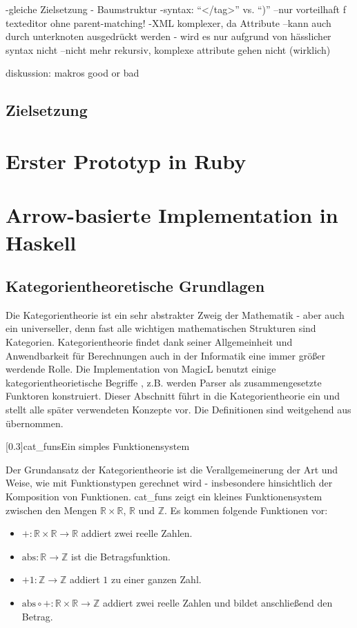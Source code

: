 \documentclass[a4paper, bibgerm]{article}
\newcommand\abb{}
\newcommand\fig{}
\newcommand\ato{\rightarrow}
\begin{document}
-gleiche Zielsetzung - Baumstruktur
-syntax: ``</tag>'' vs. ``)''
--nur vorteilhaft f texteditor ohne parent-matching!
-XML komplexer, da Attribute
--kann auch durch unterknoten ausgedrückt werden - wird es nur aufgrund
von hässlicher syntax nicht
--nicht mehr rekursiv, komplexe attribute gehen nicht (wirklich)

diskussion: makros good or bad

\subsection{Zielsetzung}
\label{sec:intro:goal}

\section{Erster Prototyp in Ruby}
\label{sec:sexy}

\section{Arrow-basierte Implementation in Haskell}
\label{sec:magicl}

\subsection{Kategorientheoretische Grundlagen}
\label{sec:magicl:cats}

Die Kategorientheorie ist ein sehr abstrakter Zweig der Mathematik -
aber auch ein universeller, denn fast alle wichtigen mathematischen
Strukturen sind Kategorien. Kategorientheorie findet dank seiner
Allgemeinheit und Anwendbarkeit für Berechnungen auch in der Informatik
eine immer größer werdende Rolle. Die Implementation von MagicL benutzt
einige kategorientheorietische Begriffe , z.B. werden Parser als
zusammengesetzte Funktoren konstruiert. Dieser Abschnitt führt in die
Kategorientheorie ein und stellt alle später verwendeten Konzepte
vor. Die Definitionen sind weitgehend aus \cite{Grundlagen} übernommen.

\fig[0.3]{cat_funs}{Ein simples Funktionensystem}

Der Grundansatz der Kategorientheorie ist die Verallgemeinerung der
Art und Weise, wie mit Funktionstypen gerechnet wird - insbesondere
hinsichtlich der Komposition von Funktionen. \abb{cat_funs} zeigt ein
kleines Funktionensystem zwischen den Mengen $\mathbb{R} \times
\mathbb{R}$, $\mathbb{R}$ und $\mathbb{Z}$. Es kommen folgende
Funktionen vor:
\begin{itemize}
\item $+ : \mathbb{R} \times \mathbb{R} \ato \mathbb{R}$ addiert zwei
  reelle Zahlen.
\item $\mathrm{abs} : \mathbb{R} \ato \mathbb{Z}$ ist die Betragsfunktion.
\item $+1 : \mathbb{Z} \ato \mathbb{Z}$ addiert $1$ zu einer ganzen Zahl.
\item $\mathrm{abs} \circ + : \mathbb{R} \times \mathbb{R} \ato \mathbb{Z}$
  addiert zwei reelle Zahlen und bildet anschließend den Betrag.
\end{itemize}
\end{document}
